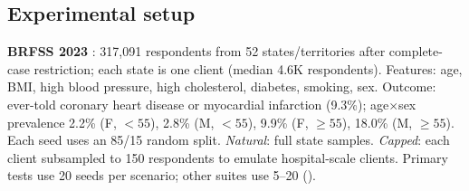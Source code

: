 \documentclass[conference]{IEEEtran}
\begin{document}
\subsection{Experimental setup}
\label{sec:setup}
\textbf{BRFSS 2023} \cite{brfss2023}: 317,091 respondents from 52 states/territories after complete-case restriction; each state is one client (median 4.6K respondents). Features: age, BMI, high blood pressure, high cholesterol, diabetes, smoking, sex. Outcome: ever-told coronary heart disease or myocardial infarction (9.3\%); age$\times$sex prevalence 2.2\% (F, $<55$), 2.8\% (M, $<55$), 9.9\% (F, $\ge55$), 18.0\% (M, $\ge55$). Each seed uses an 85/15 random split. \emph{Natural}: full state samples. \emph{Capped}: each client subsampled to 150 respondents to emulate hospital-scale clients. Primary tests use 20 seeds per scenario; other suites use 5--20 ().
\end{document}
